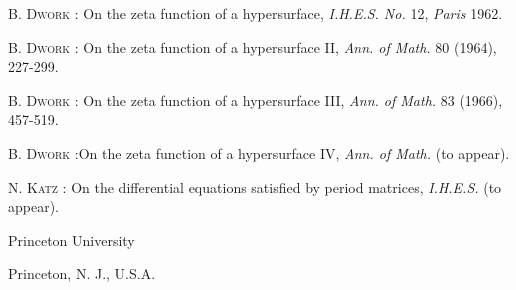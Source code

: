 \begin{thebibliography}{99}
 \textsc{B. Dwork :} On the zeta function of a hypersurface, {\em I.H.E.S. No.} 12, {\em Paris} 1962.

 \textsc{B. Dwork :} On the zeta function of a hypersurface II, {\em Ann. of Math.} 80 (1964), 227-299.

 \textsc{B. Dwork :} On the zeta function of a hypersurface III, {\em Ann. of Math.} 83 (1966), 457-519.

 \textsc{B. Dwork :}\pageoriginale On the zeta function of a hypersurface IV, {\em Ann. of Math.} (to appear).

 \textsc{N. Katz :} On the differential equations satisfied by period matrices, {\em I.H.E.S.} (to appear).
\end{thebibliography}

\medskip
\noindent
Princeton University

\noindent
Princeton, N. J., U.S.A.
